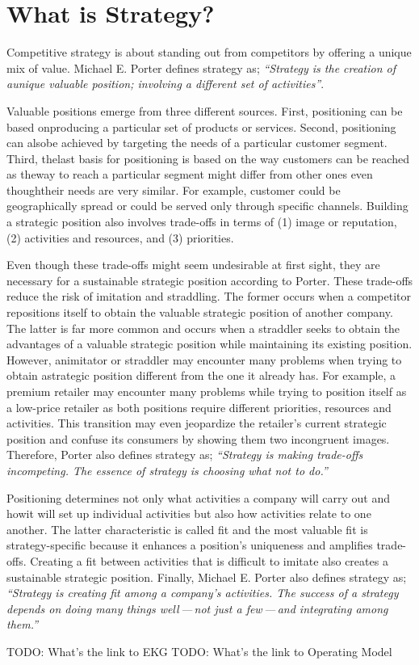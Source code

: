\section*{What is Strategy?}

Competitive strategy is about standing out from competitors by offering a unique mix of value.
Michael E. Porter defines strategy as;
\emph{“Strategy is the creation of aunique valuable position; involving a different set of activities”}\autocite{whatisstrategy}.

Valuable positions emerge from three different sources.
First, positioning can be based onproducing a particular set of products or services.
Second, positioning can alsobe achieved by targeting the needs of a particular customer segment.
Third, thelast basis for positioning is based on the way customers can be reached as theway to reach a
particular segment might differ from other ones even thoughtheir needs are very similar.
For example, customer could be geographically spread or could be served only through specific channels.
Building a strategic position also involves trade-offs in terms of
(1) image or reputation,
(2) activities and resources, and
(3) priorities.

Even though these trade-offs might seem undesirable at first sight,
they are necessary for a sustainable strategic position according to Porter.
These trade-offs reduce the risk of imitation and straddling.
The former occurs when a competitor repositions itself to obtain the valuable strategic position of another company.
The latter is far more common and occurs when a straddler seeks to obtain the advantages of
a valuable strategic position while maintaining its existing position.
However, animitator or straddler may encounter many problems when trying to obtain astrategic position
different from the one it already has.
For example, a premium retailer may encounter many problems while trying to position itself as a low-price retailer
as both positions require different priorities, resources and activities.
This transition may even jeopardize the retailer’s current strategic position and confuse its consumers
by showing them two incongruent images.
Therefore, Porter also defines strategy as;
\emph{“Strategy is making trade-offs incompeting. The essence of strategy is choosing what not to do.”}

Positioning determines not only what activities a company will carry out and howit will set up individual
activities but also how activities relate to one another.
The latter characteristic is called fit and the most valuable fit is strategy-specific because it enhances a
position’s uniqueness and amplifies trade-offs.
Creating a fit between activities that is difficult to imitate also creates a sustainable strategic position.
Finally, Michael E. Porter also defines strategy as;
\emph{“Strategy is creating fit among a company’s activities.
The success of a strategy depends on doing many things well\,---\,not just a few\,---\,and
integrating among them.”}

TODO: What's the link to EKG
TODO: What's the link to Operating Model

